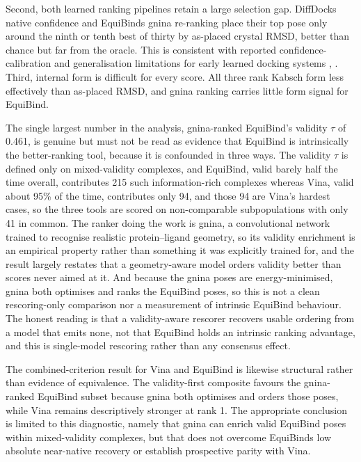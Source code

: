 Second, both learned ranking pipelines retain a large selection gap. DiffDock\textquotesingle s native confidence and EquiBind\textquotesingle s gnina re-ranking place their top pose only around the ninth or tenth best of thirty by as-placed crystal RMSD, better than chance but far from the oracle. This is consistent with reported confidence-calibration and generalisation limitations for early learned docking systems \cite{ref024}, \cite{ref035}. Third, internal form is difficult for every score. All three rank Kabsch form less effectively than as-placed RMSD, and gnina ranking carries little form signal for EquiBind.

The single largest number in the analysis, gnina-ranked EquiBind's validity \ensuremath{\tau} of 0.461, is genuine but must not be read as evidence that EquiBind is intrinsically the better-ranking tool, because it is confounded in three ways. The validity \ensuremath{\tau} is defined only on mixed-validity complexes, and EquiBind, valid barely half the time overall, contributes 215 such information-rich complexes whereas Vina, valid about 95\% of the time, contributes only 94, and those 94 are Vina's hardest cases, so the three tools are scored on non-comparable subpopulations with only 41 in common. The ranker doing the work is gnina, a convolutional network trained to recognise realistic protein--ligand geometry, so its validity enrichment is an empirical property rather than something it was explicitly trained for, and the result largely restates that a geometry-aware model orders validity better than scores never aimed at it. And because the gnina poses are energy-minimised, gnina both optimises and ranks the EquiBind poses, so this is not a clean rescoring-only comparison nor a measurement of intrinsic EquiBind behaviour. The honest reading is that a validity-aware rescorer recovers usable ordering from a model that emits none, not that EquiBind holds an intrinsic ranking advantage, and this is single-model rescoring rather than any consensus effect.

The combined-criterion result for Vina and EquiBind is likewise structural rather than evidence of equivalence. The validity-first composite favours the gnina-ranked EquiBind subset because gnina both optimises and orders those poses, while Vina remains descriptively stronger at rank 1. The appropriate conclusion is limited to this diagnostic, namely that gnina can enrich valid EquiBind poses within mixed-validity complexes, but that does not overcome EquiBind\textquotesingle s low absolute near-native recovery or establish prospective parity with Vina.

